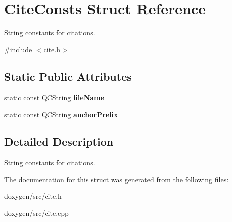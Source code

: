 \hypertarget{struct_cite_consts}{}\section{Cite\+Consts Struct Reference}
\label{struct_cite_consts}


\mbox{\hyperlink{class_string}{String}} constants for citations.  




{\ttfamily \#include $<$cite.\+h$>$}

\subsection*{Static Public Attributes}
\begin{DoxyCompactItemize}
\item 
\mbox{\label{struct_cite_consts_a76380abd8266f8b5e41511f70166f4dd}} 
static const \mbox{\hyperlink{class_q_c_string}{Q\+C\+String}} {\bfseries file\+Name}
\item 
\mbox{\label{struct_cite_consts_a1678a77efc499bf1a641ec5d04a5c41e}} 
static const \mbox{\hyperlink{class_q_c_string}{Q\+C\+String}} {\bfseries anchor\+Prefix}
\end{DoxyCompactItemize}


\subsection{Detailed Description}
\mbox{\hyperlink{class_string}{String}} constants for citations. 

The documentation for this struct was generated from the following files\+:\begin{DoxyCompactItemize}
\item 
doxygen/src/cite.\+h\item 
doxygen/src/cite.\+cpp\end{DoxyCompactItemize}
